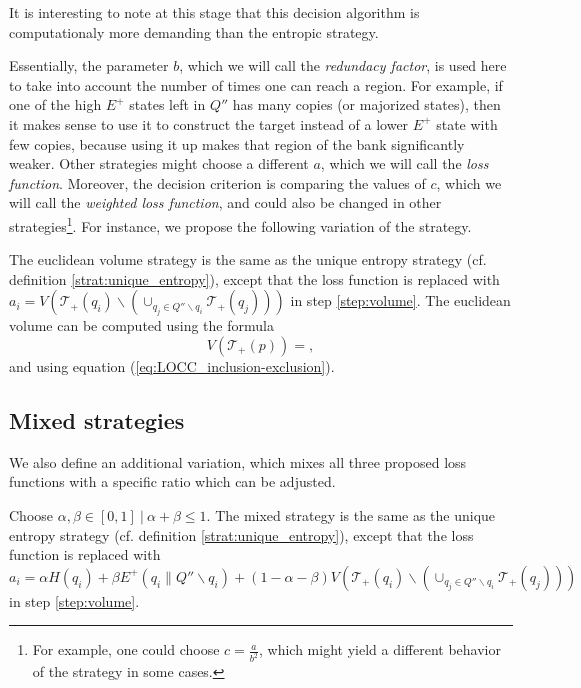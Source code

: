 \noindent It is interesting to note at this stage that this decision algorithm is computationaly more demanding than the entropic strategy.

Essentially, the parameter $b$, which we will call the \textit{redundacy factor}, is used here to take into account the number of times one can reach a region. For example, if one of the high $E^+$ states left in $Q''$ has many copies (or majorized states), then it makes sense to use it to construct the target instead of a lower $E^+$ state with few copies, because using it up makes that region of the bank significantly weaker. Other strategies might choose a different $a$, which we will call the \textit{loss function}. Moreover, the decision criterion is comparing the values of $c$, which we will call the \textit{weighted loss function}, and could also be changed in other strategies\footnote{For example, one could choose $c = \frac{a}{b^2}$, which might yield a different behavior of the strategy in some cases.}. For instance, we propose the following variation of the strategy.

\begin{definition}
    The euclidean volume strategy is the same as the unique entropy strategy (cf. definition \ref{strat:unique_entropy}), except that the loss function is replaced with $a_i = V\left(\mathcal{T}_+(q_i) \backslash \left(\cup_{q_j \in Q'' \backslash q_i} \mathcal{T}_+(q_j)\right)\right)$ in step \ref{step:volume}. The euclidean volume can be computed using the formula
\begin{equation}
    V(\mathcal{T}_+(p)) = , %
\end{equation}
and using equation (\ref{eq:LOCC_inclusion-exclusion}).
\end{definition}



\subsection{Mixed strategies}

We also define an additional variation, which mixes all three proposed loss functions with a specific ratio which can be adjusted.

\begin{definition}
    Choose $\alpha, \beta \in [0, 1] \: | \: \alpha + \beta \leq 1$. The mixed strategy is the same as the unique entropy strategy (cf. definition \ref{strat:unique_entropy}), except that the loss function is replaced with $a_i = \alpha H(q_i) + \beta E^+(q_i \parallel Q'' \backslash q_i) + (1 - \alpha - \beta) V\left(\mathcal{T}_+(q_i) \backslash \left(\cup_{q_j \in Q'' \backslash q_i} \mathcal{T}_+(q_j)\right)\right)$ in step \ref{step:volume}.
\end{definition}



